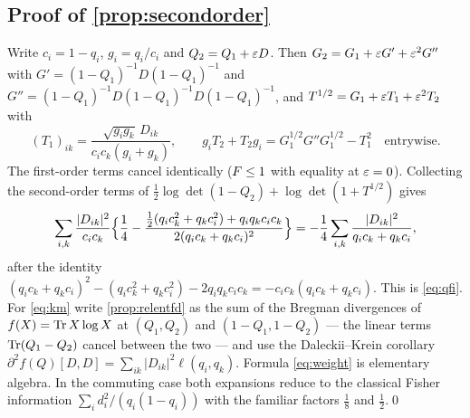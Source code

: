 \label{app:proofs}
\subsection{Proof of \texorpdfstring{\cref{prop:secondorder}}{the second-order expansion}}
\label{app:secondorder}
Write $c_i=1-q_i$, $g_i=q_i/c_i$ and $Q_2=Q_1+\varepsilon D$.  Then
$G_2=G_1+\varepsilon G'+\varepsilon^2G''$ with
$G'=(1-Q_1)^{-1}D(1-Q_1)^{-1}$ and
$G''=(1-Q_1)^{-1}D(1-Q_1)^{-1}D(1-Q_1)^{-1}$, and
$T^{1/2}=G_1+\varepsilon T_1+\varepsilon^2T_2$ with
\begin{equation}\label{eq:T1}
 (T_1)_{ik}=\frac{\sqrt{g_ig_k}\,D_{ik}}{c_ic_k(g_i+g_k)},
 \qquad
 g_iT_2+T_2g_i=G_1^{1/2}G''G_1^{1/2}-T_1^2 \quad\text{entrywise.}
\end{equation}
The first-order terms cancel identically ($F\le1$ with equality at $\varepsilon=0$).
Collecting the second-order terms of
$\frac12\log\det(1-Q_2)+\log\det(1+T^{1/2})$ gives
\begin{equation}\label{eq:collect}
 \sum_{i,k}\frac{|D_{ik}|^2}{c_ic_k}
 \Bigl\{\frac14-\frac{\frac12(q_ic_k^2+q_kc_i^2)+q_iq_kc_ic_k}
 {2(q_ic_k+q_kc_i)^2}\Bigr\}
 =-\frac14\sum_{i,k}\frac{|D_{ik}|^2}{q_ic_k+q_kc_i},
\end{equation}
after the identity
$(q_ic_k+q_kc_i)^2-(q_ic_k^2+q_kc_i^2)-2q_iq_kc_ic_k=-c_ic_k(q_ic_k+q_kc_i)$.
This is \eqref{eq:qfi}.  For \eqref{eq:km} write \cref{prop:relentfd} as the sum
of the Bregman divergences of $f(X)=\operatorname{Tr} X\log X$ at $(Q_1,Q_2)$ and
$(1-Q_1,1-Q_2)$ --- the linear terms $\operatorname{Tr}(Q_1-Q_2)$ cancel between the two --- and
use the Daleckii--Krein corollary
$\partial^2f(Q)[D,D]=\sum_{ik}|D_{ik}|^2\ell(q_i,q_k)$.  Formula
\eqref{eq:weight} is elementary algebra.  In the commuting case both expansions
reduce to the classical Fisher information $\sum_id_i^2/(q_i(1-q_i))$ with the
familiar factors $\frac18$ and $\frac12$.\qed


